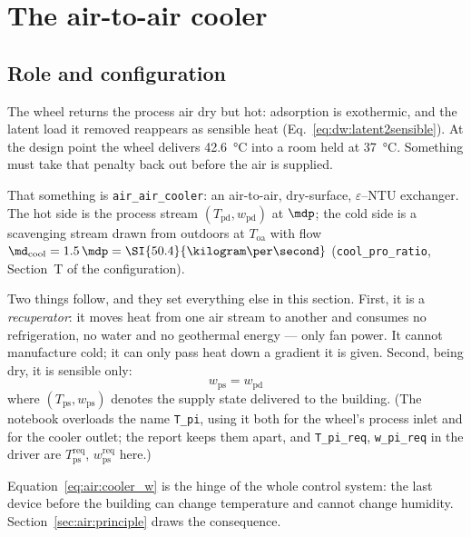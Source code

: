\section{The air-to-air cooler}
\label{sec:air:cooler}

\subsection{Role and configuration}
\label{sec:air:coolerrole}

The wheel returns the process air dry but hot: adsorption is exothermic, and
the latent load it removed reappears as sensible heat
(Eq.~\eqref{eq:dw:latent2sensible}). At the design point the wheel delivers
\SI{42.6}{\celsius} into a room held at \SI{37}{\celsius}. Something must take
that penalty back out before the air is supplied.

That something is \texttt{air\_air\_cooler}: an air-to-air, dry-surface,
$\varepsilon$--NTU exchanger. The hot side is the process stream
$(T_{\mathrm{pd}},w_{\mathrm{pd}})$ at $\mdp$; the cold side is a scavenging
stream drawn from outdoors at $T_{\mathrm{oa}}$ with flow
$\md_{\mathrm{cool}} = 1.5\,\mdp = \SI{50.4}{\kilogram\per\second}$
(\texttt{cool\_pro\_ratio}, Section~T of the configuration).

Two things follow, and they set everything else in this section. First, it is a
\emph{recuperator}: it moves heat from one air stream to another and consumes
no refrigeration, no water and no geothermal energy --- only fan power. It
cannot manufacture cold; it can only pass heat down a gradient it is given.
Second, being dry, it is sensible only:
\begin{equation}
\boxed{\;w_{\mathrm{ps}} = w_{\mathrm{pd}}\;}
\label{eq:air:cooler_w}
\end{equation}
where $(T_{\mathrm{ps}},w_{\mathrm{ps}})$ denotes the supply state delivered to
the building. (The notebook overloads the name \texttt{T\_pi}, using it both
for the wheel's process inlet and for the cooler outlet; the report keeps them
apart, and \texttt{T\_pi\_req}, \texttt{w\_pi\_req} in the driver are
$T_{\mathrm{ps}}^{\mathrm{req}}$, $w_{\mathrm{ps}}^{\mathrm{req}}$ here.)

Equation~\eqref{eq:air:cooler_w} is the hinge of the whole control system: the
last device before the building can change temperature and cannot change
humidity. Section~\ref{sec:air:principle} draws the consequence.

